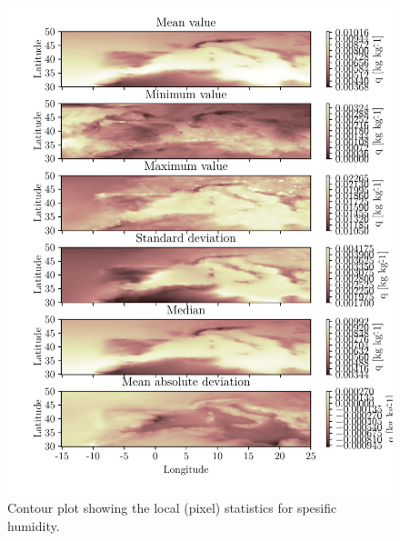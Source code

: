 \begin{figure}[ht]
    \centering
    \includegraphics{python_figs/all_stat_variable_q.pdf}
    \caption{Contour plot showing the local (pixel) statistics for spesific humidity.}
    \label{fig:all_stats_q}
\end{figure}

\cleardoublepage

